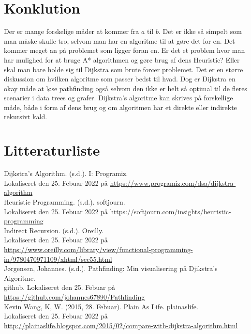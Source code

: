 \documentclass[12pt]{article}
\begin{document}
\section{Konklution}
Der er mange forskelige måder at kommer fra $a$ til $b$. Det er ikke så simpelt som man måske skulle tro, selvom man har en algoritme til at gøre det for en. Det kommer meget an på problemet som ligger foran en. Er det et problem hvor man har mulighed for at bruge A* algorithmen og gøre brug af dens Heuristic? Eller skal man bare holde sig til Dijkstra som brute forcer problemet. Det er en større diskussion om hvilken algoritme som passer bedst til hvad. Dog er Dijkstra en okay måde at løse pathfinding også selvom den ikke er helt så optimal til de fleres scenarier i data trees og grafer. Dijkstra’s algoritme kan skrives på forskellige måde, både i form af dens brug og om algoritmen har et direkte eller indirekte rekursivt kald.   
\newpage
\section{Litteraturliste}
Dijkstra's Algorithm. (s.d.). I: Programiz. \\Lokaliseret den 25. Febuar 2022 på \href{https://www.programiz.com/dsa/dijkstra-algorithm}{https://www.programiz.com/dsa/dijkstra-algorithm}\\

Heuristic Programming. (s.d.). softjourn. \\Lokaliseret den 25. Febuar 2022 på \href{https://softjourn.com/insights/heuristic-programming}{https://softjourn.com/insights/heuristic-programming}\\

Indirect Recursion. (s.d.). Oreilly. \\Lokaliseret den 25. Febuar 2022 på \href{https://www.oreilly.com/library/view/functional-programming-in/9780470971109/xhtml/sec55.html}{https://www.oreilly.com/library/view/functional-programming-in/9780470971109/xhtml/sec55.html}\\

Jørgensen, Johannes. (s.d.). Pathfinding: Min visualisering på Djikstra's Algoritme. \\github. Lokaliseret den 25. Febuar på \href{https://github.com/johannes67890/Pathfinding}{https://github.com/johannes67890/Pathfinding}\\

Kevin Wang, K, W. (2015, 28. Febuar). Plain As Life. plainaslife. \\Lokaliseret den 25. Febuar 2022 på \href{http://plainaslife.blogspot.com/2015/02/compare-with-dijkstra-algorithm.html}{http://plainaslife.blogspot.com/2015/02/compare-with-dijkstra-algorithm.html}\\
\end{document}
